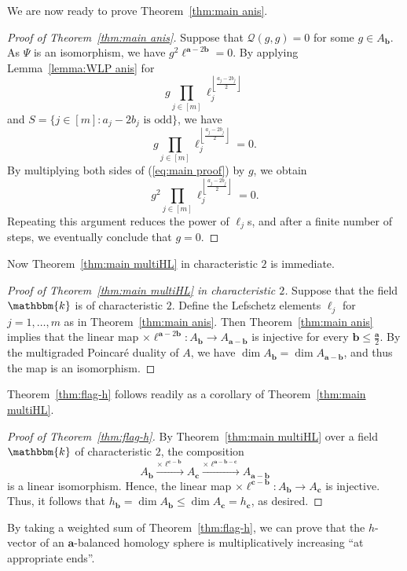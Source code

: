 We are now ready to prove Theorem~\ref{thm:main anis}.
\begin{proof}[Proof of Theorem~\ref{thm:main anis}]
Suppose that $\mathcal{Q}(g,g)=0$ for some $g \in A_{\bm{b}}$. As $\Psi$ is an isomorphism, we have $g^2\bm{\ell}^{\bm{a}-2\bm{b}}=0$.
By applying Lemma~\ref{lemma:WLP anis} for 
\[
g\prod_{j \in [m]} \ell_j^{\left\lfloor \frac{a_j-2b_j}{2}\right\rfloor}
\]
and $S=\{j \in [m]:a_j-2b_j \text{ is odd}\}$, we have
\begin{equation}
g\prod_{j \in [m]} \ell_j^{\left\lfloor \frac{a_j-2b_j}{2}\right\rfloor}=0. \label{eq:main proof}
\end{equation}
By multiplying both sides of (\ref{eq:main proof}) by $g$, we obtain  
\[
g^2\prod_{j \in [m]} \ell_j^{\left\lfloor \frac{a_j-2b_j}{2}\right\rfloor}=0.
\]
Repeating this argument reduces the power of $\ell_j$s, and after a finite number of steps, we eventually conclude that $g=0$.
\end{proof}
Now Theorem~\ref{thm:main multiHL} in characteristic $2$ is immediate.
\begin{proof}[Proof of Theorem~\ref{thm:main multiHL} in characteristic $2$]
Suppose that the field $\mathbbm{k}$ is of characteristic $2$.
Define the Lefschetz elements $\ell_j$ for $j=1,\ldots,m$ as in Theorem~\ref{thm:main anis}.
Then Theorem~\ref{thm:main anis} implies that the linear map $\times \bm{\ell}^{\bm{a}-2\bm{b}}:A_{\bm{b}} \rightarrow A_{\bm{a}-\bm{b}}$ is injective for every $\bm{b} \leq \frac{\bm{a}}{2}$.
By the multigraded Poincar\'{e} duality of $A$, we have $\dim A_{\bm{b}}=\dim A_{\bm{a}-\bm{b}}$, and thus the map is an isomorphism.
\end{proof}
Theorem~\ref{thm:flag-h} follows readily as a corollary of Theorem~\ref{thm:main multiHL}.
\begin{proof}[Proof of Theorem~\ref{thm:flag-h}]
By Theorem~\ref{thm:main multiHL} over a field $\mathbbm{k}$ of characteristic $2$, the composition
\[
A_{\bm{b}} \overset{\times \bm{\ell}^{\bm{c}-\bm{b}}}{\longrightarrow} A_{\bm{c}} \overset{\times \bm{\ell}^{\bm{a}-\bm{b}-\bm{c}}}{\longrightarrow} A_{\bm{a}-\bm{b}}
\]
is a linear isomorphism. Hence, the linear map $\times \bm{\ell}^{\bm{c}-\bm{b}}:A_{\bm{b}}\rightarrow A_{\bm{c}}$ is injective.
Thus, it follows that $h_{\bm{b}} = \dim A_{\bm{b}} \leq \dim A_{\bm{c}} = h_{\bm{c}}$, as desired.
\end{proof}
By taking a weighted sum of Theorem~\ref{thm:flag-h}, we can prove that the $h$-vector of an $\bm{a}$-balanced homology sphere is multiplicatively increasing ``at appropriate ends''. 
